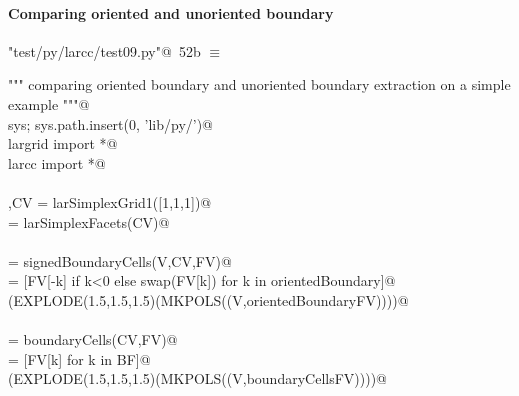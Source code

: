 \documentclass[11pt,oneside]{article}    %
\begin{document}
\paragraph{Comparing oriented and unoriented boundary}

\begin{flushleft} \small \label{scrap84}
\protect{}\verb@"test/py/larcc/test09.py"@\nobreak\ {\footnotesize 52b }$\equiv$
\vspace{-1ex}
\begin{list}{}{} \item
\mbox{}\verb@""" comparing oriented boundary and unoriented boundary extraction on a simple example """@\\
\mbox{}\verb@import sys; sys.path.insert(0, 'lib/py/')@\\
\mbox{}\verb@from largrid import *@\\
\mbox{}\verb@from larcc import *@\\
\mbox{}\verb@@\\
\mbox{}\verb@V,CV = larSimplexGrid1([1,1,1])@\\
\mbox{}\verb@FV = larSimplexFacets(CV)@\\
\mbox{}\verb@@\\
\mbox{}\verb@orientedBoundary = signedBoundaryCells(V,CV,FV)@\\
\mbox{}\verb@orientedBoundaryFV = [FV[-k] if k<0 else swap(FV[k]) for k in orientedBoundary]@\\
\mbox{}\verb@VIEW(EXPLODE(1.5,1.5,1.5)(MKPOLS((V,orientedBoundaryFV))))@\\
\mbox{}\verb@@\\
\mbox{}\verb@BF = boundaryCells(CV,FV)@\\
\mbox{}\verb@boundaryCellsFV = [FV[k] for k in BF]@\\
\mbox{}\verb@VIEW(EXPLODE(1.5,1.5,1.5)(MKPOLS((V,boundaryCellsFV))))@\\
\mbox{}\verb@@{\NWsep}
\end{list}
\vspace{-2ex}
\end{flushleft}
\end{document}
